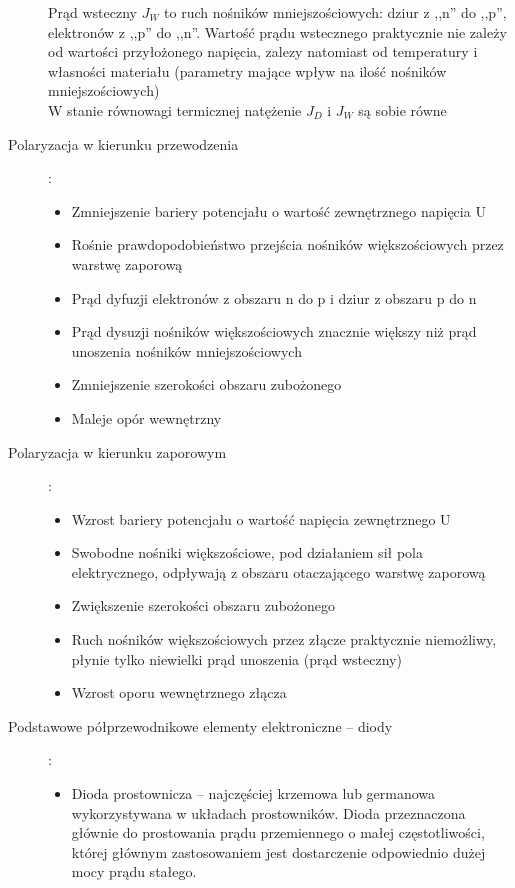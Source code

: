 \documentclass[a4paper,11pt]{article}
\begin{document}
\begin{description}
  Prąd wsteczny $J_W$ to ruch nośników mniejszościowych: dziur z ,,n'' do ,,p'', elektronów z ,,p'' do ,,n''. Wartość prądu wstecznego praktycznie nie zależy od wartości przyłożonego napięcia, zalezy natomiast od temperatury i własności materiału (parametry mające wpływ na ilość nośników mniejszościowych)\\
  W stanie równowagi termicznej natężenie $J_D$ i $J_W$ są sobie równe
\item[Polaryzacja w kierunku przewodzenia]:
  \begin{itemize}
  \item Zmniejszenie bariery potencjału o wartość zewnętrznego napięcia U
  \item Rośnie prawdopodobieństwo przejścia nośników większościowych przez warstwę zaporową
  \item Prąd dyfuzji elektronów z obszaru n do p i dziur z obszaru p do n
  \item Prąd dysuzji nośników większościowych znacznie większy niż prąd unoszenia nośników mniejszościowych
  \item Zmniejszenie szerokości obszaru zubożonego
  \item Maleje opór wewnętrzny
  \end{itemize}
\item[Polaryzacja w kierunku zaporowym]:
  \begin{itemize}
  \item Wzrost bariery potencjału o wartość napięcia zewnętrznego U
  \item Swobodne nośniki większościowe, pod działaniem sił pola elektrycznego, odpływają z obszaru otaczającego warstwę zaporową
  \item Zwiększenie szerokości obszaru zubożonego
  \item Ruch nośników większościowych przez złącze praktycznie niemożliwy, płynie tylko niewielki prąd unoszenia (prąd wsteczny)
  \item Wzrost oporu wewnętrznego złącza
  \end{itemize}
\item[Podstawowe półprzewodnikowe elementy elektroniczne -- diody]:
  \begin{itemize}
  \item Dioda prostownicza -- najczęściej krzemowa lub germanowa wykorzystywana w układach prostowników. Dioda przeznaczona głównie do prostowania prądu przemiennego o małej częstotliwości, której głównym zastosowaniem jest dostarczenie odpowiednio dużej mocy prądu stałego.\\

\end{itemize}
\end{description}
\end{document}
